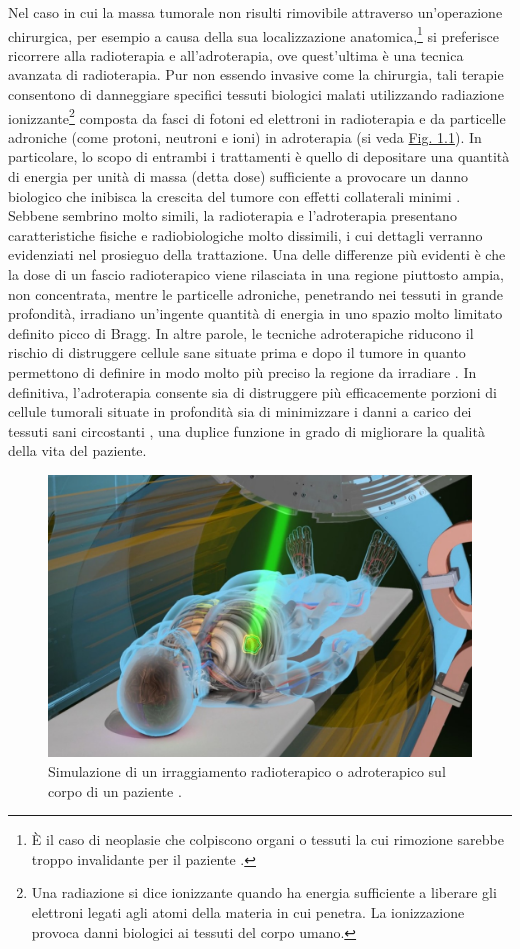 \documentclass[12pt,a4paper,twoside]{report}
\begin{document}
	Nel caso in cui la massa tumorale non risulti rimovibile attraverso un'operazione chirurgica, per esempio a causa della sua localizzazione anatomica,\footnote{\`E il caso di neoplasie che colpiscono organi o tessuti la cui rimozione sarebbe troppo invalidante per il paziente \cite{foot_site}.} si preferisce ricorrere alla radioterapia e all'adroterapia, ove quest'ultima è una tecnica avanzata di radioterapia. Pur non essendo invasive come la chirurgia, tali terapie consentono di danneggiare specifici tessuti biologici malati utilizzando radiazione ionizzante\footnote{Una radiazione si dice ionizzante quando ha energia sufficiente a liberare gli elettroni legati agli atomi della materia in cui penetra. La ionizzazione provoca danni biologici ai tessuti del corpo umano.} composta da fasci di fotoni ed elettroni in radioterapia e da particelle adroniche (come protoni, neutroni e ioni) in adroterapia (si veda \hyperref[fig:simulation]{Fig. 1.1}). In particolare, lo scopo di entrambi i trattamenti è quello di depositare una quantità di energia per unità di massa (detta dose) sufficiente a provocare un danno biologico che inibisca la crescita del tumore con effetti collaterali minimi \cite{asimmetrie_curareCLP}. Sebbene sembrino molto simili, la radioterapia e l'adroterapia presentano caratteristiche fisiche e radiobiologiche molto dissimili, i cui dettagli verranno evidenziati nel prosieguo della trattazione. Una delle differenze più evidenti è che la dose di un fascio radioterapico viene rilasciata in una regione piuttosto ampia, non concentrata, mentre le particelle adroniche, penetrando nei tessuti in grande profondità, irradiano un'ingente quantità di energia in uno spazio molto limitato definito picco di Bragg. In altre parole, le tecniche adroterapiche riducono il rischio di distruggere cellule sane situate prima e dopo il tumore in quanto permettono di definire in modo molto più preciso la regione da irradiare \cite{foot_site}. In definitiva, l'adroterapia consente sia di distruggere più efficacemente porzioni di cellule tumorali situate in profondità sia di minimizzare i danni a carico dei tessuti sani circostanti \cite{cnao1}, una duplice funzione in grado di migliorare la qualità della vita del paziente.
	\begin{figure}[H]
		\centering
		\includegraphics[width=0.95\linewidth]{simulation.jpg}
		\caption{Simulazione di un irraggiamento radioterapico o adroterapico sul corpo di un paziente \cite{treatment_photo}.}
		\label{fig:simulation}
	\end{figure}
\end{document}
